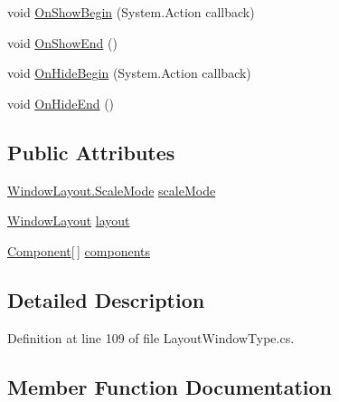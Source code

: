 \begin{DoxyCompactItemize}
\item 
void \hyperlink{class_unity_engine_1_1_u_i_1_1_windows_1_1_types_1_1_layout_a3e851d9ddd952081f7836dac98af17c6}{On\+Show\+Begin} (System.\+Action callback)
\item 
void \hyperlink{class_unity_engine_1_1_u_i_1_1_windows_1_1_types_1_1_layout_a63139cc03e9bbc36dbb0ffea6bee4705}{On\+Show\+End} ()
\item 
void \hyperlink{class_unity_engine_1_1_u_i_1_1_windows_1_1_types_1_1_layout_a0f6dca9b03e92792dfa94d418ceec217}{On\+Hide\+Begin} (System.\+Action callback)
\item 
void \hyperlink{class_unity_engine_1_1_u_i_1_1_windows_1_1_types_1_1_layout_a3b94ae72c665e8f4b036cdbfaa000884}{On\+Hide\+End} ()
\end{DoxyCompactItemize}
\subsection*{Public Attributes}
\begin{DoxyCompactItemize}
\item 
\hyperlink{class_unity_engine_1_1_u_i_1_1_windows_1_1_window_layout_ad2ea7c8dd3f2f3c0edc178901af60728}{Window\+Layout.\+Scale\+Mode} \hyperlink{class_unity_engine_1_1_u_i_1_1_windows_1_1_types_1_1_layout_a0bbeabcabbf50cf8525e70db2a840c1a}{scale\+Mode}
\item 
\hyperlink{class_unity_engine_1_1_u_i_1_1_windows_1_1_window_layout}{Window\+Layout} \hyperlink{class_unity_engine_1_1_u_i_1_1_windows_1_1_types_1_1_layout_a56d39baaf051959b4a7c5b3cced14c79}{layout}
\item 
\hyperlink{class_unity_engine_1_1_u_i_1_1_windows_1_1_types_1_1_layout_1_1_component}{Component}\mbox{[}$\,$\mbox{]} \hyperlink{class_unity_engine_1_1_u_i_1_1_windows_1_1_types_1_1_layout_afd821bb2d6a05114faafa4a05099410f}{components}
\end{DoxyCompactItemize}


\subsection{Detailed Description}


Definition at line 109 of file Layout\+Window\+Type.\+cs.



\subsection{Member Function Documentation}
\hypertarget{class_unity_engine_1_1_u_i_1_1_windows_1_1_types_1_1_layout_a13ecdbd61891445dfd943c730fcc284a}{}
